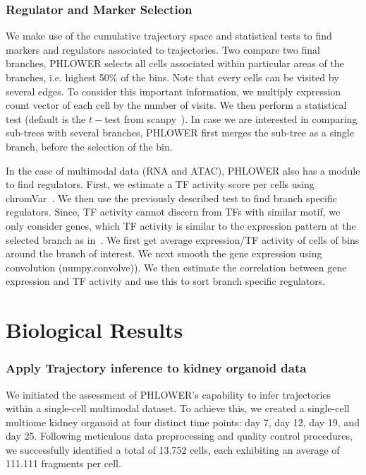 \subsubsection{Regulator and Marker Selection}
We make use of the cumulative trajectory space and statistical tests to find markers and regulators associated to trajectories. Two compare two final branches, PHLOWER selects all cells associated within particular areas of the branches, i.e. highest \num{50}$\%$ of the bins. Note that every cells can be visited by several edges. To consider this important information, we multiply expression count vector of each cell by the number of visits. We then perform a statistical test (default is the $t-$test from scanpy~\cite{wolf2018scanpy}). In case we are interested in comparing sub-trees with several branches, PHLOWER first merges the sub-tree as a single branch, before the selection of the bin.

In the case of multimodal data (RNA and ATAC), PHLOWER also has a module to find regulators. First, we estimate a TF activity score per cells using chromVar~\cite{schep2017chromvar}. We then use the previously described test to find branch specific regulators. Since, TF activity cannot discern from TFs with similar motif, we only consider genes, which TF activity is similar to the expression pattern at the selected branch as in~\cite{li2023scmega}. We first get average expression/TF activity of cells of bins around the branch of interest. We next smooth the gene expression using convolution (numpy.convolve)). We then estimate the correlation between gene expression and TF activity and use this to sort branch specific regulators. 

\section{Biological Results}
\subsubsection{Apply Trajectory inference to kidney organoid data}

We initiated the assessment of PHLOWER's capability to infer trajectories within a single-cell multimodal dataset. To achieve this, we created a single-cell multiome kidney organoid at four distinct time points: day \num{7}, day \num{12}, day \num{19}, and day \num{25}. Following meticulous data preprocessing and quality control procedures, we successfully identified a total of \num{13,752} cells, each exhibiting an average of \num{111,111} fragments per cell.

